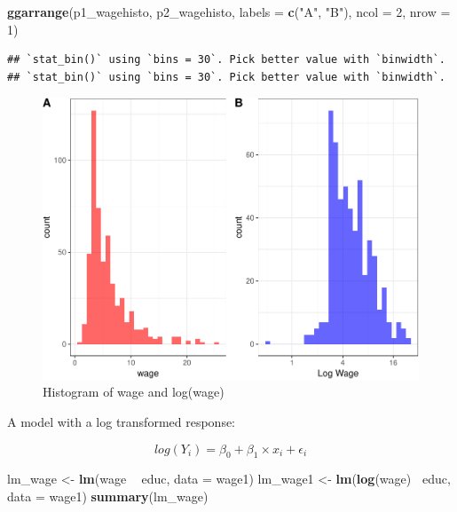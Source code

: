 \documentclass[]{book}
\newenvironment{Shaded}{\begin{snugshade}}{\end{snugshade}}
\newcommand{\DataTypeTok}[1]{\textcolor[rgb]{0.13,0.29,0.53}{#1}}
\newcommand{\DecValTok}[1]{\textcolor[rgb]{0.00,0.00,0.81}{#1}}
\newcommand{\KeywordTok}[1]{\textcolor[rgb]{0.13,0.29,0.53}{\textbf{#1}}}
\newcommand{\NormalTok}[1]{#1}
\newcommand{\OperatorTok}[1]{\textcolor[rgb]{0.81,0.36,0.00}{\textbf{#1}}}
\newcommand{\StringTok}[1]{\textcolor[rgb]{0.31,0.60,0.02}{#1}}
\begin{document}
\begin{Shaded}
\begin{Highlighting}[]
\KeywordTok{ggarrange}\NormalTok{(p1_wagehisto, p2_wagehisto,  }
          \DataTypeTok{labels =} \KeywordTok{c}\NormalTok{(}\StringTok{"A"}\NormalTok{, }\StringTok{"B"}\NormalTok{),}
          \DataTypeTok{ncol =} \DecValTok{2}\NormalTok{, }\DataTypeTok{nrow =} \DecValTok{1}\NormalTok{)}
\end{Highlighting}
\end{Shaded}

\begin{verbatim}
## `stat_bin()` using `bins = 30`. Pick better value with `binwidth`.
## `stat_bin()` using `bins = 30`. Pick better value with `binwidth`.
\end{verbatim}

\begin{figure}

{\centering \includegraphics[width=0.8\linewidth]{MEM5220_R_files/figure-latex/fig11-1} 

}

\caption{Histogram of wage and log(wage)}\label{fig:fig11}
\end{figure}

A model with a log transformed response:

\begin{equation}
log(Y_{i}) = \beta_{0} + \beta_{1} \times x_{i} + \epsilon_{i}
\end{equation}

\begin{Shaded}
\begin{Highlighting}[]
\NormalTok{lm_wage <-}\StringTok{ }\KeywordTok{lm}\NormalTok{(wage }\OperatorTok{~}\StringTok{ }\NormalTok{educ, }\DataTypeTok{data =}\NormalTok{ wage1)}
\NormalTok{lm_wage1 <-}\StringTok{ }\KeywordTok{lm}\NormalTok{(}\KeywordTok{log}\NormalTok{(wage)}\OperatorTok{~}\StringTok{ }\NormalTok{educ, }\DataTypeTok{data =}\NormalTok{  wage1)}
\KeywordTok{summary}\NormalTok{(lm_wage)}
\end{Highlighting}
\end{Shaded}
\end{document}
